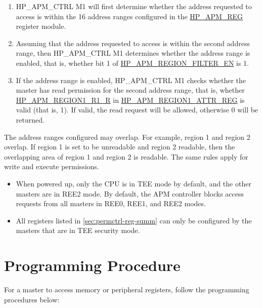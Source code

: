 \documentclass[main\_\_EN.tex]{subfiles}
\begin{document}
\begin{enumerate}
    \item HP\_APM\_CTRL M1 will first determine whether the address requested to access is within the 16 address ranges configured in the \hyperref[sec:permctrl-reg-hp]{HP\_APM\_REG} register module.

    \item Assuming that the address requested to access is within the second address range, then HP\_APM\_CTRL M1 determines whether the address range is enabled, that is, whether bit 1 of \hyperref[fielddesc:HPAPMREGIONFILTEREN]{HP\_APM\_REGION\_FILTER\_EN} is 1.

    \item If the address range is enabled, HP\_APM\_CTRL M1 checks whether the master has read permission for the second address range, that is, whether \hyperref[fielddesc:HPAPMREGION0R1R]{HP\_APM\_REGION1\_R1\_R} in \hyperref[regdesc:HPAPMREGION0ATTRREG]{HP\_APM\_REGION1\_ATTR\_REG} is valid (that is, 1). If valid, the read request will be allowed, otherwise 0 will be returned.

\end{enumerate}

The address ranges configured may overlap. For example, region 1 and region 2 overlap. If region 1 is set to be unreadable and region 2 readable, then the overlapping area of region 1 and region 2 is readable. The same rules apply for write and execute permissions.


\begin{tiplisting}
\vspace{-2em}
\begin{itemize}
    \item When powered up, only the CPU is in TEE mode by default, and the other masters are in REE2 mode. By default, the APM controller blocks access requests from all masters in REE0, REE1, and REE2 modes.
    \item All registers listed in \ref{sec:permctrl-reg-summ} \textit{}  can only be configured by the masters that are in TEE security mode.
\end{itemize}
\end{tiplisting}

\section{Programming Procedure}

For a master to access memory or peripheral registers, follow the programming procedures below:
\end{document}

